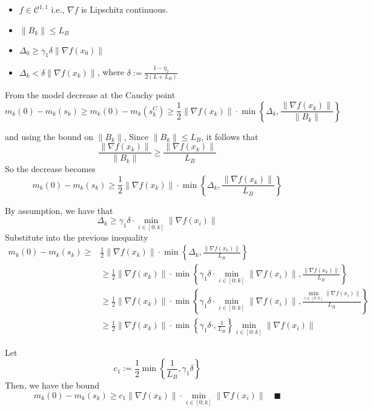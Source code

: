 \documentclass{ExerciseSheet}
\begin{document}
\begin{solution}
    \begin{itemize}
    \item $ f \in \mathcal{C}^{1,1} $ i.e., $ \nabla f $ is Lipschitz continuous.
    \item $ \|B_k\| \leq L_B $
    \item $ \Delta_0 \geq \gamma_1 \delta \|\nabla f(x_0)\| $
    \item $ \Delta_k < \delta \|\nabla f(x_k)\| $, where $ \delta := \frac{1 - \eta_2}{2(L + L_B)} $
\end{itemize}

\vskip 0.3cm
From the model decrease at the Cauchy point
\[
m_k(0) - m_k(s_k) \geq m_k(0) - m_k(s_k^C) \geq \frac{1}{2} \|\nabla f(x_k)\| \cdot \min\left\{ \Delta_k, \frac{\|\nabla f(x_k)\|}{\|B_k\|} \right\}
\]

and using the bound on $\|B_k\|$,
Since $ \|B_k\| \leq L_B $, it follows that
\[ \frac{\|\nabla f(x_k)\|}{\|B_k\|} \geq \frac{\|\nabla f(x_k)\|}{L_B} \]
So the decrease becomes
\[m_k(0) - m_k(s_k) \geq \frac{1}{2} \|\nabla f(x_k)\| \cdot \min\left\{ \Delta_k, \frac{\|\nabla f(x_k)\|}{L_B} \right\}\]


By assumption, we have that
\[
\Delta_k \geq \gamma_1 \delta \cdot \min_{i \in [0:k]} \|\nabla f(x_i)\|
\]
Substitute into the previous inequality
\begin{align*}
    m_k(0) - m_k(s_k) \geq & \frac{1}{2} \|\nabla f(x_k)\| \cdot \min\left\{ \Delta_k, \frac{\|\nabla f(x_k)\|}{L_B} \right\} \\
    &\geq \frac{1}{2} \|\nabla f(x_k)\| \cdot \min\left\{\gamma_1 \delta \cdot \min_{i \in [0:k]} \|\nabla f(x_i)\| , \frac{\|\nabla f(x_k)\|}{L_B} \right\} \\
    &\geq \frac{1}{2} \|\nabla f(x_k)\| \cdot \min\left\{\gamma_1 \delta \cdot \min_{i \in [0:k]} \|\nabla f(x_i)\| , \frac{\min_{i \in [0:k]}\|\nabla f(x_i)\|}{L_B} \right\}\\
    &\geq \frac{1}{2} \|\nabla f(x_k)\| \cdot \min\left\{\gamma_1 \delta \cdot , \frac{1}{L_B} \right\} \min_{i \in [0:k]} \|\nabla f(x_i)\|
\end{align*}

Let
\[
c_1 := \frac{1}{2} \min\left\{ \frac{1}{L_B}, \gamma_1 \delta \right\}
\]
Then, we have the bound
\[ m_k(0) - m_k(s_k) \geq c_1 \|\nabla f(x_k)\| \cdot \min_{i \in [0:k]} \|\nabla f(x_i)\|\quad \blacksquare\]
\end{solution}
\end{document}
